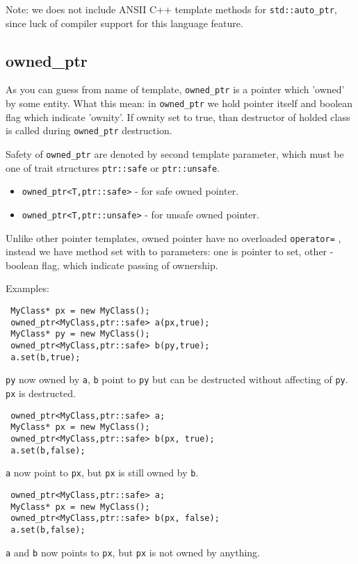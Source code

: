 \documentclass[10pt]{article}
\begin{document}
Note: we does not include ANSII C++ template methods for \verb|std::auto_ptr|,
since luck of compiler support for this language feature. 

\subsection{ owned\_ptr }

As you can guess from name of template, \verb|owned_ptr| is a pointer which
'owned' by some entity. What this mean: in \verb|owned_ptr| we hold pointer
itself and boolean flag which indicate 'ownity'. If ownity set to true,
than destructor of holded class is called during \verb|owned_ptr| destruction.

Safety of \verb|owned_ptr| are denoted by second template parameter, which
must be one of trait structures \verb|ptr::safe| or \verb|ptr::unsafe|.
\begin{itemize}
 \item \verb|owned_ptr<T,ptr::safe>| - for safe owned pointer.
 \item \verb|owned_ptr<T,ptr::unsafe>| - for unsafe owned pointer.
\end{itemize}

Unlike other pointer templates, owned pointer have no overloaded
\verb|operator=| , instead we have method set with to parameters: one is
pointer to set, other - boolean flag, which indicate passing of ownership.

Examples:
\begin{verbatim}
 MyClass* px = new MyClass();
 owned_ptr<MyClass,ptr::safe> a(px,true);
 MyClass* py = new MyClass();
 owned_ptr<MyClass,ptr::safe> b(py,true);
 a.set(b,true); 
\end{verbatim}
 \verb|py| now owned by \verb|a|, \verb|b| point to \verb|py| but can be 
destructed without affecting of \verb|py|. \verb|px| is destructed.

\begin{verbatim}
 owned_ptr<MyClass,ptr::safe> a;
 MyClass* px = new MyClass();
 owned_ptr<MyClass,ptr::safe> b(px, true);
 a.set(b,false); 
\end{verbatim}
 \verb|a| now point to \verb|px|, but \verb|px| is still owned by \verb|b|. 

\begin{verbatim}
 owned_ptr<MyClass,ptr::safe> a;
 MyClass* px = new MyClass();
 owned_ptr<MyClass,ptr::safe> b(px, false);
 a.set(b,false); 
\end{verbatim}
 \verb|a| and \verb|b| now points to \verb|px|, but \verb|px| is not owned
by anything. 
\end{document}
